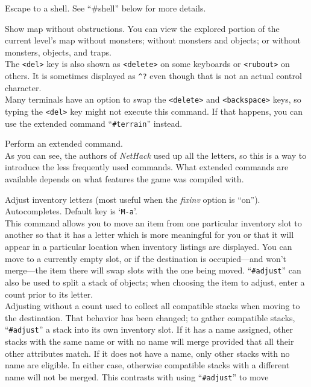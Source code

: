 \item[\tb{!}]
Escape to a shell.
See ``\#shell'' below for more details.
\item[\tb{Del}]
Show map without obstructions.
You can view the explored portion of the current level's map without
monsters; without monsters and objects; or without monsters, objects,
and traps.\\
The {\tt <del>} key is also shown as {\tt <delete>} on some keyboards or
{\tt <rubout>} on others.
It is sometimes displayed as {\tt \^{}?} even though that is not an actual
control character.\\
Many terminals have an option to swap the {\tt <delete>} and {\tt <backspace>}
keys, so typing the {\tt <del>} key might not execute this command.
If that happens, you can use the extended command ``{\tt \#terrain}'' instead.
\item[\tb{\#}]
Perform an extended command.\\
As you can see, the authors of {\it NetHack\/}
used up all the letters, so this is a way to introduce the less frequently
used commands.
What extended commands are available depends on what features
the game was compiled with.
\item[\tb{\#adjust}]
Adjust inventory letters (most useful when the
{\it fixinv\/}
option is ``on''). Autocompletes. Default key is `{\tt M-a}'.\\
This command allows you to move an item from one particular inventory
slot to another so that it has a letter which is more meaningful for you
or that it will appear in a particular location when inventory listings
are displayed.
You can move to a currently empty slot, or if the destination is
occupied---and won't merge---the
item there will swap slots with the one being moved.
``{\tt \#adjust}'' can also be used to split a stack of objects; when
choosing the item to adjust, enter a count prior to its letter.\\
Adjusting without a count used to collect all compatible stacks when
moving to the destination.  That behavior has been changed; to gather
compatible stacks, ``{\tt \#adjust}'' a stack into its own inventory slot.
If it has a name assigned, other stacks with the same name or with
no name will merge provided that all their other attributes match.
If it does not have a name, only other stacks with no name are eligible.
In either case, otherwise compatible stacks with a different name
will not be merged.  This contrasts with using ``{\tt \#adjust}'' to move
